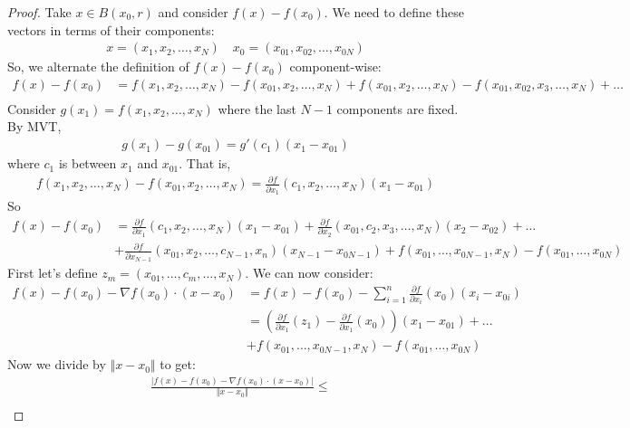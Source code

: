 \documentclass{report}
\begin{document}
\begin{proof}
    Take $x \in B(x_0, r)$ and consider $f(x) - f(x_0)$. We need to define these vectors in terms of their components:
    \begin{align*}
        x = (x_1, x_2, \ldots, x_N) \quad x_0 = (x_{01}, x_{02}, \ldots, x_{0N})
    \end{align*}
    So, we alternate the definition of $f(x) - f(x_0)$ component-wise:
    \begin{align*}
        f(x) - f(x_0) &= f(x_1, x_2, \ldots, x_N) - f(x_{01}, x_2, \ldots, x_N) + f(x_{01}, x_2, \ldots, x_N) - f(x_{01}, x_{02}, x_3, \ldots, x_N) + \ldots \\
    \end{align*}
    Consider $g(x_1) = f(x_1, x_2, \ldots, x_N)$ where the last $N-1$ components are fixed. By MVT,
    \begin{align*}
        g(x_1) - g(x_{01}) = g'(c_1)(x_1 - x_{01})
    \end{align*}
    where $c_1$ is between $x_1$ and $x_{01}$. That is,
    \begin{align*}
        f(x_1, x_2, \ldots, x_N) - f(x_{01}, x_2, \ldots, x_N) = \frac{\partial f}{\partial x_1}(c_1, x_2, \ldots, x_N)(x_1 - x_{01})
    \end{align*}
    So 
    \begin{align*}
        f(x) - f(x_0) &= \frac{\partial f}{\partial x_1} (c_1, x_2, \ldots, x_N)(x_1 - x_{01}) + \frac{\partial f}{\partial x_2} (x_{01}, c_2, x_3, \ldots, x_N)(x_2 - x_{02}) + \ldots \\
        &+ \frac{\partial f}{\partial x_{N-1}} (x_{01}, x_2, \ldots, c_{N-1}, x_n)(x_{N-1} - x_{0N-1}) + f(x_{01}, \ldots, x_{0N-1}, x_N) - f(x_{01}, \ldots, x_{0N})
    \end{align*}
    First let's define $z_m = (x_{01}, \ldots, c_m, \ldots, x_N)$. We can now consider:
    \begin{align*}
        f(x) - f(x_0) - \nabla f(x_0) \cdot (x - x_0) &= f(x) - f(x_0)  - \sum_{i=1}^n \frac{\partial f}{\partial x_i}(x_0)(x_i - x_{0i}) \\
        &= \left(\frac{\partial f}{\partial x_1} (z_1)- \frac{\partial f}{\partial x_1}(x_0)\right)(x_1 - x_{01}) + \ldots \\
        &+ f(x_{01}, \ldots, x_{0N-1}, x_N) - f(x_{01}, \ldots, x_{0N}) 
    \end{align*}
    Now we divide by $\Vert x - x_0 \Vert$ to get:
    \begin{align*}
        &\frac{| f(x) -f(x_0) - \nabla f(x_0) \cdot (x-x_0)|}{\Vert x - x_0 \Vert} \leq \\

\end{align*}
\end{proof}
\end{document}
